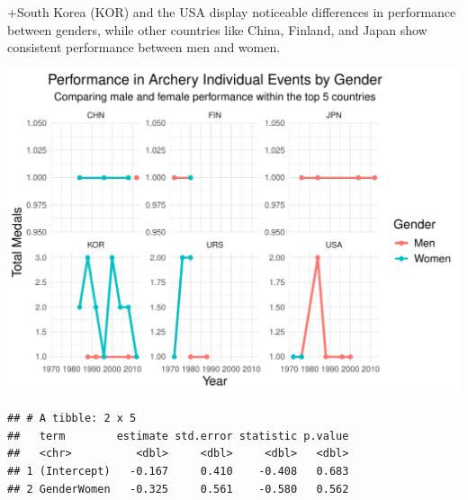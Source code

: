 \documentclass[12pt,preprint, authoryear]{elsarticle}
\let\origfigure\figure
\let\endorigfigure\endfigure
\renewenvironment{figure}[1][2] {
    \expandafter\origfigure\expandafter[H]
} {
    \endorigfigure
}
\numberwithin{equation}{section}
\numberwithin{figure}{section}
\numberwithin{table}{section}
\begin{document}
+South Korea (KOR) and the USA display noticeable differences in
performance between genders, while other countries like China, Finland,
and Japan show consistent performance between men and women.

\begin{figure}

{\centering \includegraphics{README_files/figure-latex/unnamed-chunk-6-1} 

}

\caption{The Top Countries that Dominate in both the Summer and Winter Olympics\label{Figure6}}\label{fig:unnamed-chunk-6}
\end{figure}

\begin{verbatim}
## # A tibble: 2 x 5
##   term        estimate std.error statistic p.value
##   <chr>          <dbl>     <dbl>     <dbl>   <dbl>
## 1 (Intercept)   -0.167     0.410    -0.408   0.683
## 2 GenderWomen   -0.325     0.561    -0.580   0.562
\end{verbatim}
\end{document}
